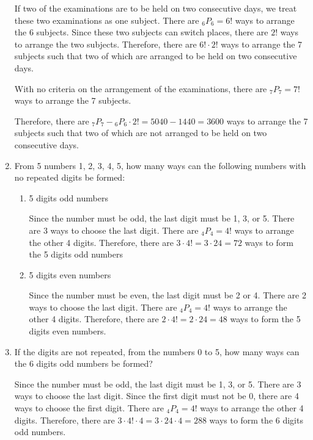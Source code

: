 \documentclass{report}
\newcommand\permtwo[2][^n]{{}_{#1}P_{#2}}
\begin{document}
\begin{multicols}{2}
\begin{enumerate}
          If two of the examinations are to be held on two consecutive days, we treat
          these two examinations as one subject. There are $\permtwo[6]{6} = 6!$ ways to
          arrange the 6 subjects. Since these two subjects can switch places, there are
          $2!$ ways to arrange the two subjects. Therefore, there are $6! \cdot 2!$ ways
          to arrange the 7 subjects such that two of which are arranged to be held on two
          consecutive days.

          With no criteria on the arrangement of the examinations, there are
          $\permtwo[7]{7} = 7!$ ways to arrange the 7 subjects.

          Therefore, there are $\permtwo[7]{7} - \permtwo[6]{6} \cdot 2! = 5040 - 1440 =
            3600$ ways to arrange the 7 subjects such that two of which are not arranged to
          be held on two consecutive days.

    \item From 5 numbers 1, 2, 3, 4, 5, how many ways can the following numbers with no
          repeated digits be formed:
          \begin{enumerate}
            \item 5 digits odd numbers
                  \sol{}

                  Since the number must be odd, the last digit must be 1, 3, or 5. There are 3
                  ways to choose the last digit. There are $\permtwo[4]{4} = 4!$ ways to arrange
                  the other 4 digits. Therefore, there are $3 \cdot 4! = 3 \cdot 24 = 72$ ways to
                  form the 5 digits odd numbers

            \item 5 digits even numbers
                  \sol{}

                  Since the number must be even, the last digit must be 2 or 4. There are 2 ways
                  to choose the last digit. There are $\permtwo[4]{4} = 4!$ ways to arrange the
                  other 4 digits. Therefore, there are $2 \cdot 4! = 2 \cdot 24 = 48$ ways to
                  form the 5 digits even numbers.
          \end{enumerate}

    \item If the digits are not repeated, from the numbers 0 to 5, how many ways can the
          6 digits odd numbers be formed? \sol{}

          Since the number must be odd, the last digit must be 1, 3, or 5. There are 3
          ways to choose the last digit. Since the first digit must not be 0, there are 4
          ways to choose the first digit. There are $\permtwo[4]{4} = 4!$ ways to arrange
          the other 4 digits. Therefore, there are $3 \cdot 4! \cdot 4 = 3 \cdot 24 \cdot
            4 = 288$ ways to form the 6 digits odd numbers.


\end{enumerate}
\end{multicols}
\end{document}
